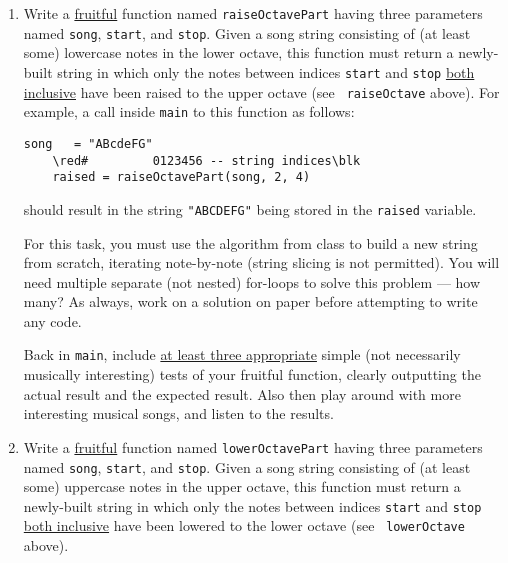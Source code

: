 \documentclass[10pt]{article}
\newcommand{\blk}{\color{black}}
\newcommand{\red}{\color{red}}
\begin{document}
\begin{enumerate}

    \item Write a \uline{fruitful} function named {\tt raiseOctavePart} having 
        three parameters named {\tt song}, {\tt start}, and {\tt stop}.
        Given a song string consisting of (at least some) lowercase notes in
        the lower octave, this function must return a newly-built string in
        which only the notes between indices {\tt start} and {\tt stop}
        \uline{both inclusive} have been raised to the upper octave (see {\tt
        raiseOctave} above).
        For example, a call inside {\tt main} to this function as follows:
\begin{Verbatim}[commandchars=\\\{\}]
    song   = "ABcdeFG"
    \red#         0123456 -- string indices\blk
    raised = raiseOctavePart(song, 2, 4)
\end{Verbatim}
        should result in the string \verb+"ABCDEFG"+ being stored in the 
        {\tt raised} variable.

        \vspace*{6pt}
        For this task, you must use the algorithm from class to build a new
        string from scratch, iterating note-by-note (string slicing is not
        permitted).
        You will need multiple separate (not nested) for-loops to solve 
        this problem --- how many?
        As always, work on a solution on paper before attempting to write
        any code.

        \vspace*{6pt}
        Back in {\tt main}, include \uline{at least three appropriate} simple
        (not necessarily musically interesting) tests of your fruitful
        function, clearly outputting the actual result and the expected result.  
        Also then play around with more interesting musical songs, and
        listen to the results.

    \item Write a \uline{fruitful} function named {\tt lowerOctavePart} having 
        three parameters named {\tt song}, {\tt start}, and {\tt stop}.
        Given a song string consisting of (at least some) uppercase notes in
        the upper octave, this function must return a newly-built string in
        which only the notes between indices {\tt start} and {\tt stop}
        \uline{both inclusive} have been lowered to the lower octave (see {\tt
        lowerOctave} above).


\end{enumerate}
\end{document}

